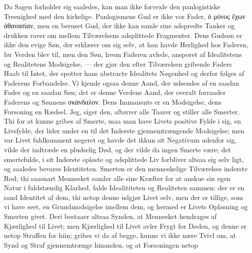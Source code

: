 \documentclass[12pt]{book}
\newcommand{\opage}[1]{\marginnote{\footnotesize\textit{[#1]}}}
\begin{document}
Da Sagen forholder sig saaledes, kan man ikke forvexle den panlogistiske
Treenighed med den kirkelige. Panlogismens Gud er ikke vor Fader,
ὁ μόνος ἔχων ἀθανασίαν, men en beruset Gud, der ikke kan samle sine adspredte
Tanker og drukken raver om mellem Tilværelsens adsplittede Fragmenter. Dens
Gudsøn er ikke den evige Søn, der erklærer om sig selv, at han havde Herlighed
hos Faderen, før Verden blev til, men den Søn, hvem Faderen avlede, ansporet af
Idealitetens
\opage{142} og Realitetens Modsigelse, --- der gjør den efter Tilværelsen gribende Faders
Haab til Intet, der spotter hans abstracte Idealitets Nøgenhed og derfor følges
af Faderens Forbandelse. Vi kjende ogsaa denne Aand, der udsendes af en saadan
Fader og en saadan Søn; det er denne Verdens Aand, der overalt forraader
Faderens og Sønnens σκάνδαλον. Dens Immanents er en Modsigelse, dens Forsoning
en Rædsel. Jeg, siger den, aftørrer alle Taarer og stiller alle Smerter. Thi
for at kunne gribes af Smerte, maa man have Livets positive Fylde i sig, en
Livsfylde, der lider under en til det Inderste gjennemtrængende Modsigelse; men
var Livet fuldkomment negeret og havde det ikkun sit Negativum udenfor sig,
vilde der indtræde en pludselig Død, og der vilde da ingen Smerte være; det
smertefulde, i sit Inderste opløste og adsplittede Liv forbliver altsaa sig selv
ligt, og saaledes bevares Identiteten. Smerten er den menneskelige Tilværelses
inderste Rod; thi saasnart Mennesket samler alle sine Kræfter for at anskue sin
egen Natur i fuldstændig Klarhed, falde Idealititeten og Realiteten sammen: der
er en sand Identitet af dem, thi netop denne udgjør Livet selv, men der er
tillige, som vi have seet, en Grundmodsigelse imellem dem, og hermed er Livets
Opløsning og Smerten givet. Deri bestaaer altsaa Synden, at Mennesket hendrages
af Kjærlighed til Livet; men Kjærlighed til Livet avler Frygt for Døden, og
denne er netop Straffen for hiin; gribes vi da af begge, kunne vi ikke nære
Tvivl om, at Synd og Straf gjennemtrænge hinanden, og at Forsoningen netop
\end{document}
